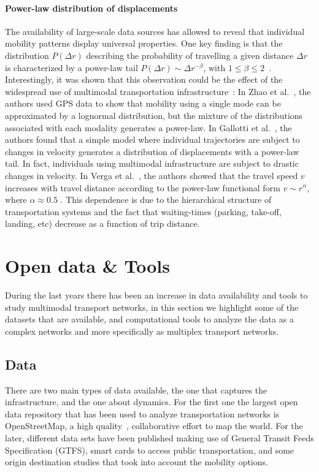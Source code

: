 \paragraph{Power-law distribution of displacements} 
The availability of large-scale data sources has allowed to reveal that individual mobility patterns display universal properties. One key finding is that the distribution $P(\Delta r)$ describing the probability of travelling a given distance $\Delta r$ is characterized by a power-law tail $P(\Delta r)\sim \Delta r ^{-\beta}$, with $1 \leq \beta \leq 2$~\cite{barbosa2018human}. Interestingly, it was shown that this observation could be the effect of the widespread use of multimodal transportation infrastructure~\cite{gallotti2016stochastic,zhao2015explaining}: In Zhao et al.~\cite{zhao2015explaining}, the authors used GPS data to show that mobility using a single mode can be approximated by a lognormal distribution, but the mixture of the distributions associated with each modality generates a power-law. In Gallotti et al.~\cite{gallotti2016stochastic}, the authors found that a simple model where individual trajectories are subject to changes in velocity generates a distribution of displacements with a power-law tail. In fact, individuals using multimodal infrastructure are subject to drastic changes in velocity. In Verga et al.~\cite{varga2016further}, the authors showed that the travel speed $v$ increases with travel distance according to the power-law functional form $v \sim r ^\alpha$, where $\alpha \approx 0.5$ . This dependence is due to the hierarchical structure of transportation systems and the fact that waiting-times (parking, take-off, landing, etc) decrease as a function of trip distance.

\section{Open data \& Tools \label{sec:datatools}}

During the last years there has been an increase in data availability and tools to study multimodal transport networks, in this section we highlight some of the datasets that are available, and computational tools to analyze the data as a complex networks and more specifically as multiplex transport networks.

\subsection{Data}
There are two main types of data available, the one that captures the infrastructure, and the one about dynamics. For the first one the largest open data repository that has been used to analyze transportation networks is OpenStreetMap, a high quality~\cite{haklay2010openstreetmap,girres2010quality,ferster2019openstreetmap,barbosa2018human}, collaborative effort to map the world. For the later, different data sets have been published making use of General Transit Feeds Specification (GTFS), smart cards to access public transportation, and some origin destination studies that took into account the mobility options. 


